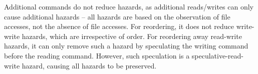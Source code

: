 \proof Additional commands do not reduce hazards, as additional reads/writes can only cause additional hazards -- all hazards are based on the observation of file accesses, not the absence of file accesses. For reordering, it does not reduce write-write hazards, which are irrespective of order. For reordering away read-write hazards, it can only remove such a hazard by speculating the writing command before the reading command. However, such speculation is a speculative-read-write hazard, causing all hazards to be preserved.

\begin{comment}

\subsection{No rebuilds}
\label{sec:proof:no_rebuild}

We prove that a build system with deterministic control logic and with no hazards always results in no rebuilds when no changes have occurred.

\begin{align}
  build :: \bar{command} \\
  command :: (cmd, reads :: \bar{file}, writes:: \bar{file}) \\
  file :: (name, content) \\
  eq(f1 :: file, f2 :: file) = name(f1) = name(f2) \&\& content(f1) = content(f2) \\
  hazard :: (file, command, command) \\
  files(command) = reads(command) \cup writes(command)
\end{align}

In a build system without hazards there is at most one write to any file, which occurs before any reads of that file. We can therefore prove there are no rebuilds by showing the first command can't rebuild, and proceeding by induction.

Let $B$ be a build with no hazards when executed sequentially.

\begin{description}
\item[Base case: $|B| = 1$]

  $\forall f \in reads(B[0]) \cup writes(B[0]), f \text{ has not changed}$, therefore, $B[0]$ does not run, and $\forall f \in writes(B[0])$ are not written to.



\end{comment}
